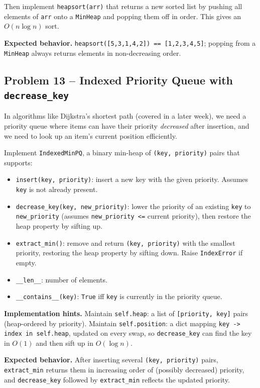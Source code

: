 \documentclass[11pt]{article}
\begin{document}
Then implement \texttt{heapsort(arr)} that returns a new sorted list by pushing all
elements of \texttt{arr} onto a \texttt{MinHeap} and popping them off in order. This gives
an $O(n\log n)$ sort.

\textbf{Expected behavior.} \texttt{heapsort([5,3,1,4,2]) == [1,2,3,4,5]}; popping from a
\texttt{MinHeap} always returns elements in non-decreasing order.

\subsection*{Problem 13 -- Indexed Priority Queue with \texttt{decrease\_key}}

In algorithms like Dijkstra's shortest path (covered in a later week), we need a priority
queue where items can have their priority \emph{decreased} after insertion, and we need to
look up an item's current position efficiently.

Implement \texttt{IndexedMinPQ}, a binary min-heap of \texttt{(key, priority)} pairs that
supports:
\begin{itemize}
    \item \texttt{insert(key, priority)}: insert a new key with the given priority.
    Assumes \texttt{key} is not already present.
    \item \texttt{decrease\_key(key, new\_priority)}: lower the priority of an existing
    \texttt{key} to \texttt{new\_priority} (assumes \texttt{new\_priority <=} current
    priority), then restore the heap property by sifting up.
    \item \texttt{extract\_min()}: remove and return \texttt{(key, priority)} with the
    smallest priority, restoring the heap property by sifting down. Raise
    \texttt{IndexError} if empty.
    \item \texttt{\_\_len\_\_}: number of elements.
    \item \texttt{\_\_contains\_\_(key)}: \texttt{True} iff \texttt{key} is currently in
    the priority queue.
\end{itemize}

\textbf{Implementation hints.} Maintain \texttt{self.heap}: a list of \texttt{[priority,
key]} pairs (heap-ordered by priority). Maintain \texttt{self.position}: a dict mapping
\texttt{key -> index in self.heap}, updated on every swap, so \texttt{decrease\_key} can
find the key in $O(1)$ and then sift up in $O(\log n)$.

\textbf{Expected behavior.} After inserting several \texttt{(key, priority)} pairs,
\texttt{extract\_min} returns them in increasing order of (possibly decreased) priority,
and \texttt{decrease\_key} followed by \texttt{extract\_min} reflects the updated
priority.
\end{document}
